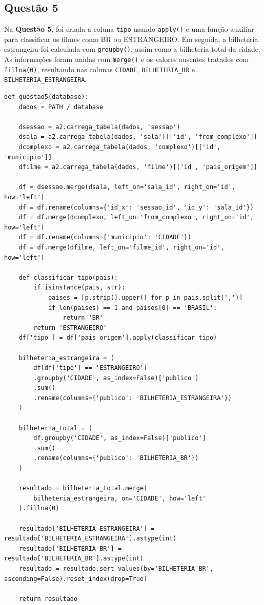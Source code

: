 \documentclass{article}
\begin{document}
\subsection*{Questão 5}
\linespread{1.5}
Na \textbf{Questão 5}, foi criada a coluna \texttt{tipo} usando \texttt{apply()} e uma função auxiliar para classificar os filmes como BR ou ESTRANGEIRO. Em seguida, a bilheteria estrangeira foi calculada com \texttt{groupby()}, assim como a bilheteria total da cidade. As informações foram unidas com \texttt{merge()} e os valores ausentes tratados com \texttt{fillna(0)}, resultando nas colunas \texttt{CIDADE}, \texttt{BILHETERIA\_BR} e \texttt{BILHETERIA\_ESTRANGEIRA}.
\linespread{1}
\begin{lstlisting}
def questao5(database):
    dados = PATH / database

    dsessao = a2.carrega_tabela(dados, 'sessao')
    dsala = a2.carrega_tabela(dados, 'sala')[['id', 'from_complexo']]
    dcomplexo = a2.carrega_tabela(dados, 'complexo')[['id', 'municipio']]
    dfilme = a2.carrega_tabela(dados, 'filme')[['id', 'pais_origem']]

    df = dsessao.merge(dsala, left_on='sala_id', right_on='id', how='left')
    df = df.rename(columns={'id_x': 'sessao_id', 'id_y': 'sala_id'})
    df = df.merge(dcomplexo, left_on='from_complexo', right_on='id', how='left')
    df = df.rename(columns={'municipio': 'CIDADE'})
    df = df.merge(dfilme, left_on='filme_id', right_on='id', how='left')

    def classificar_tipo(pais):
        if isinstance(pais, str):
            paises = [p.strip().upper() for p in pais.split(',')]
            if len(paises) == 1 and paises[0] == 'BRASIL':
                return 'BR'
        return 'ESTRANGEIRO'
    df['tipo'] = df['pais_origem'].apply(classificar_tipo)

    bilheteria_estrangeira = (
        df[df['tipo'] == 'ESTRANGEIRO']
        .groupby('CIDADE', as_index=False)['publico']
        .sum()
        .rename(columns={'publico': 'BILHETERIA_ESTRANGEIRA'})
    )

    bilheteria_total = (
        df.groupby('CIDADE', as_index=False)['publico']
        .sum()
        .rename(columns={'publico': 'BILHETERIA_BR'})
    )

    resultado = bilheteria_total.merge(
        bilheteria_estrangeira, on='CIDADE', how='left'
    ).fillna(0)

    resultado['BILHETERIA_ESTRANGEIRA'] = resultado['BILHETERIA_ESTRANGEIRA'].astype(int)
    resultado['BILHETERIA_BR'] = resultado['BILHETERIA_BR'].astype(int)
    resultado = resultado.sort_values(by='BILHETERIA_BR', ascending=False).reset_index(drop=True)

    return resultado

\end{lstlisting}
\end{document}
